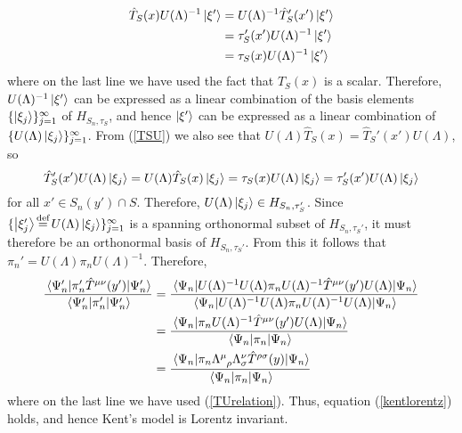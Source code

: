 \begin{equation}\label{TSUxi}
\begin{split}
\hat{T}_S(x)U(\Lambda)^{-1}\ket{\xi'}&= U(\Lambda)^{-1} \hat{T}_S'(x')\ket{\xi'}\\
&=\tau_S'(x')U(\Lambda)^{-1}\ket{\xi'}\\
&=\tau_S(x)U(\Lambda)^{-1}\ket{\xi'}
\end{split}
\end{equation}
where on the last line we have used the fact that $T_S(x)$ is a scalar. Therefore, $U(\Lambda)^{-1}\ket{\xi'}$ can be expressed as a linear combination of the basis elements $\{\ket{\xi_j}\}_{j=1}^\infty$ of $H_{S_n,\tau_S}$, and hence  $\ket{\xi'}$  can be expressed as a linear combination of $\{U(\Lambda)\ket{\xi_j}\}_{j=1}^\infty$. From (\ref{TSU}) we also see that  $U(\Lambda)\hat{T}_S(x)=\hat{T}_S'(x')U(\Lambda)$, so
$$
\hat{T}_S'(x')U(\Lambda)\ket{\xi_j}=U(\Lambda)\hat{T}_S(x)\ket{\xi_j}=\tau_S(x)U(\Lambda)\ket{\xi_j}=\tau_S'(x')U(\Lambda)\ket{\xi_j}
$$
for all $x'\in S_n(y')\cap S$. Therefore, $U(\Lambda)\ket{\xi_j}\in H_{S_n,\tau_S'}$.
Since $\{\ket{\xi_j'}\myeq U(\Lambda)\ket{\xi_j}\}_{j=1}^\infty$ is a spanning orthonormal subset of $H_{S_n,\tau_S'}$, it must therefore be an orthonormal basis of $H_{S_n,\tau_S'}$. From this it follows that $\pi_n'=U(\Lambda)\pi_nU(\Lambda)^{-1}$. Therefore, 
\begin{equation}\label{kentlorentz2}
\begin{split}
\frac{\ev{\pi_n'\hat{T}^{\mu\nu}(y')}{\Psi_n'}}{\ev{\pi_n'}{\Psi_n'}}&=\frac{\ev{U(\Lambda)^{-1}U(\Lambda)\pi_nU(\Lambda)^{-1}\hat{T}^{\mu\nu}(y')U(\Lambda)}{\Psi_n}}{\ev{U(\Lambda)^{-1}U(\Lambda)\pi_n U(\Lambda)^{-1}U(\Lambda)}{\Psi_n}}\\
&=\frac{\ev{\pi_nU(\Lambda)^{-1}\hat{T}^{\mu\nu}(y')U(\Lambda)}{\Psi_n}}{\ev{\pi_n}{\Psi_n}}\\
&=\frac{\ev{\pi_n\Lambda\indices{^\mu_\rho}\Lambda{^\nu_\sigma}\hat{T}^{\rho\sigma}(y)}{\Psi_n}}{\ev{\pi_n }{\Psi_n}}
\end{split}
\end{equation}
where on the last line we have used (\ref{TUrelation}). Thus, equation (\ref{kentlorentz}) holds, and hence Kent's model is Lorentz invariant.

